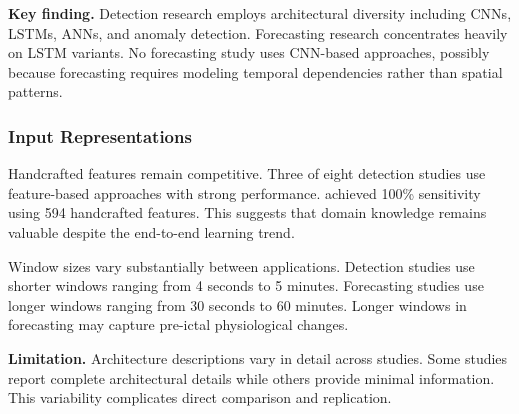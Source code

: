 \textbf{Key finding.} Detection research employs architectural diversity including CNNs, LSTMs, ANNs, and anomaly detection. Forecasting research concentrates heavily on LSTM variants. No forecasting study uses CNN-based approaches, possibly because forecasting requires modeling temporal dependencies rather than spatial patterns.

\subsubsection{Input Representations}

Handcrafted features remain competitive. Three of eight detection studies use feature-based approaches with strong performance. \textcite{fineDetectionKeyAutomated2025} achieved 100\% sensitivity using 594 handcrafted features. This suggests that domain knowledge remains valuable despite the end-to-end learning trend.

Window sizes vary substantially between applications. Detection studies use shorter windows ranging from 4 seconds to 5 minutes. Forecasting studies use longer windows ranging from 30 seconds to 60 minutes. Longer windows in forecasting may capture pre-ictal physiological changes.

\textbf{Limitation.} Architecture descriptions vary in detail across studies. Some studies report complete architectural details while others provide minimal information. This variability complicates direct comparison and replication.
